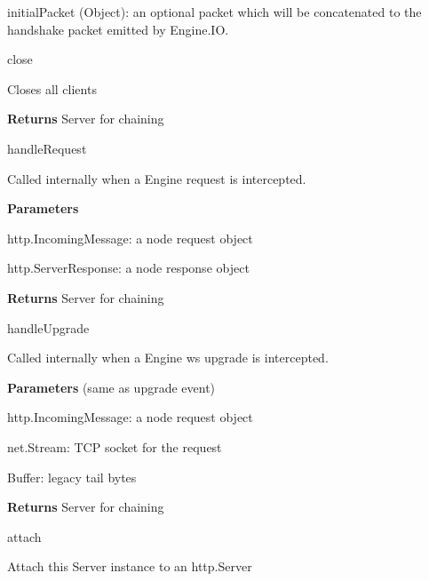 \begin{DoxyItemize}
\begin{DoxyItemize}
\begin{DoxyItemize}
\item {\ttfamily initial\+Packet} ({\ttfamily Object})\+: an optional packet which will be concatenated to the handshake packet emitted by Engine.\+IO.
\end{DoxyItemize}
\end{DoxyItemize}
\item {\ttfamily close}
\begin{DoxyItemize}
\item Closes all clients
\item {\bfseries Returns} {\ttfamily Server} for chaining
\end{DoxyItemize}
\item {\ttfamily handle\+Request}
\begin{DoxyItemize}
\item Called internally when a {\ttfamily Engine} request is intercepted.
\item {\bfseries Parameters}
\begin{DoxyItemize}
\item {\ttfamily http.\+Incoming\+Message}\+: a node request object
\item {\ttfamily http.\+Server\+Response}\+: a node response object
\end{DoxyItemize}
\item {\bfseries Returns} {\ttfamily Server} for chaining
\end{DoxyItemize}
\item {\ttfamily handle\+Upgrade}
\begin{DoxyItemize}
\item Called internally when a {\ttfamily Engine} ws upgrade is intercepted.
\item {\bfseries Parameters} (same as {\ttfamily upgrade} event)
\begin{DoxyItemize}
\item {\ttfamily http.\+Incoming\+Message}\+: a node request object
\item {\ttfamily net.\+Stream}\+: T\+CP socket for the request
\item {\ttfamily Buffer}\+: legacy tail bytes
\end{DoxyItemize}
\item {\bfseries Returns} {\ttfamily Server} for chaining
\end{DoxyItemize}
\item {\ttfamily attach}
\begin{DoxyItemize}
\item Attach this Server instance to an {\ttfamily http.\+Server}

\end{DoxyItemize}
\end{DoxyItemize}
